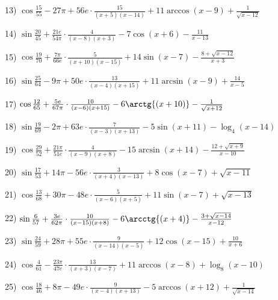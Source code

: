 \documentclass[11pt,ukrainian]{article}
\begin{document}
13) \space 
{ ${\cos\frac{15}{55}} - 27{\pi} + 56 e\cdot {\frac{15}{(x + 5)(x - 14)}} + {11\arccos{(x - 9)}} + {\frac{1}{\sqrt{x - 12}}}$}
\smallskip\par
14) \space 
{ ${\sin\frac{20}{45}} + \frac{21 e}{54{\pi}}\cdot {\frac{4}{(x - 8)(x + 3)}} - {7\cos{(x + 6)}} - { \frac{11}{x - 13}}$}
\smallskip\par
15) \space 
{ ${\cos\frac{19}{70}} + \frac{7{\pi}}{66 e}\cdot {\frac{5}{(x + 10)(x - 15)}} + {14\sin{(x - 7)}} - {\frac{8 + \sqrt{x - 12}}{x + 3}}$}
\smallskip\par
16) \space 
{ ${\sin\frac{25}{64}} - 9{\pi} + 50 e\cdot {\frac{13}{(x - 4)(x + 15)}} + {11\arcsin{(x - 9)}} + { \frac{14}{x - 5}}$}
\smallskip\par
17) \space 
{ ${\cos\frac{12}{65}} + \frac{5 e}{67{\pi}}\cdot {\frac{10}{(x - 6)(x + 15)}} - {6\arctg{(x + 10)}} - {\frac{1}{\sqrt{x + 12}}}$}
\smallskip\par
18) \space 
{ ${\sin\frac{19}{69}} - 2{\pi} + 63 e\cdot {\frac{7}{(x - 3)(x + 13)}} - {5\sin{(x + 11)}} - {\log_{4}(x - 14)}$}
\smallskip\par
19) \space 
{ ${\cos\frac{29}{52}} + \frac{21{\pi}}{51 e}\cdot {\frac{4}{(x - 9)(x + 8)}} - {15\arcsin{(x + 14)}} - {\frac{12 + \sqrt{x + 9}}{x - 10}}$}
\smallskip\par
20) \space 
{ ${\sin\frac{17}{53}} + 14{\pi} - 56 e\cdot {\frac{3}{(x + 4)(x - 13)}} + {8\cos{(x - 7)}} + {\sqrt{x - 11}}$}
\smallskip\par
21) \space 
{ ${\cos\frac{13}{68}} + 30{\pi} - 48 e\cdot {\frac{5}{(x - 6)(x + 5)}} + {11\sin{(x - 7)}} + {\sqrt{x - 13}}$}
\smallskip\par
22) \space 
{ ${\sin\frac{6}{57}} + \frac{3 e}{62{\pi}}\cdot {\frac{10}{(x - 15)(x + 8)}} - {6\arcctg{(x + 4)}} - {\frac{3 + \sqrt{x - 14}}{x - 12}}$}
\smallskip\par
23) \space 
{ ${\sin\frac{24}{59}} + 28{\pi} + 55 e\cdot {\frac{9}{(x - 14)(x - 5)}} + {12\cos{(x - 15)}} + { \frac{10}{x + 6}}$}
\smallskip\par
24) \space 
{ ${\cos\frac{4}{61}} - \frac{23{\pi}}{47 e}\cdot {\frac{13}{(x + 3)(x - 7)}} + {11\arccos{(x - 8)}} + {\log_{8}(x - 10)}$}
\smallskip\par
25) \space 
{ ${\cos\frac{18}{46}} + 8{\pi} - 49 e\cdot {\frac{9}{(x - 4)(x + 13)}} - {5\arccos{(x + 12)}} + {\frac{1}{\sqrt{x - 14}}}$}
\smallskip\par
\end{document}
